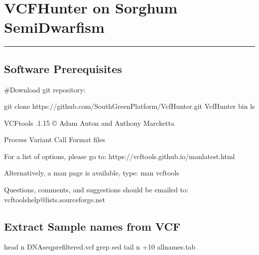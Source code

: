 \documentclass[letterpaper,10pt,english]{sphinxhowto}
\begin{document}
\pagestyle{plain}
\sphinxtableofcontents
\pagestyle{normal}
\label{\detokenize{index::doc}}



\section{VCFHunter on Sorghum Semi\sphinxhyphen{}Dwarfism}
\label{\detokenize{VCFHunter:vcfhunter-on-sorghum-semi-dwarfism}}\label{\detokenize{VCFHunter::doc}}

\bigskip\hrule\bigskip



\subsection{Software Prerequisites}
\label{\detokenize{VCFHunter:software-prerequisites}}
\sphinxAtStartPar
\#Download git repository:

\begin{sphinxVerbatim}[commandchars=\\\{\}]
git clone https://github.com/SouthGreenPlatform/VcfHunter.git
 VcfHunter
 bin
ls


VCFtools .1.15
© Adam Auton and Anthony Marcketta 

Process Variant Call Format files

For a list of options, please go to:
https://vcftools.github.io/man\PYGZus{}latest.html

Alternatively, a man page is available, type:
man vcftools

Questions, comments, and suggestions should be emailed to:
vcftools\PYGZhy{}help@lists.sourceforge.net
\end{sphinxVerbatim}


\subsection{Extract Sample names from VCF}
\label{\detokenize{VCFHunter:extract-sample-names-from-vcf}}
\begin{sphinxVerbatim}[commandchars=\\\{\}]
head \PYGZhy{}n  DNAseq\PYGZus{}prefiltered.vcf  grep   sed   tail \PYGZhy{}n +10 \PYGZgt{} all\PYGZus{}names.tab
\end{sphinxVerbatim}
\end{document}
